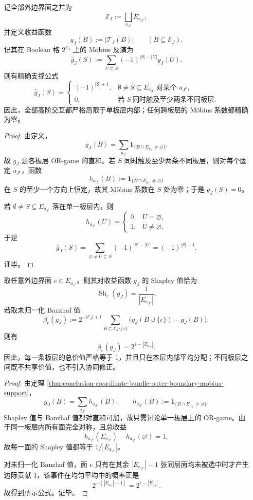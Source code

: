 \begin{theorem}\label{thm:conclusion-coordinate-bundle-outer-boundary-mobius-support}
记全部外边界面之并为
\[
\mathcal E_J:=\bigsqcup_{a_{J^c}}E_{a_{J^c}},
\]
并定义收益函数
\[
g_J(B):=|\mathcal T_J(B)|
\qquad
(B\subseteq \mathcal E_J).
\]
记其在 Boolean 格 \(2^{\mathcal E_J}\) 上的 Möbius 反演为
\[
\widehat g_J(S)
:=
\sum_{U\subseteq S}(-1)^{|S|-|U|}g_J(U).
\]
则有精确支撑公式
\[
\widehat g_J(S)=
\begin{cases}
(-1)^{|S|+1},& \emptyset\neq S\subseteq E_{a_{J^c}}\ \text{对某个 }a_{J^c},\\[0.6ex]
0,& \text{若 }S\ \text{同时触及至少两条不同板层}.
\end{cases}
\]
因此，全部高阶交互都严格局限于单板层内部；任何跨板层的 Möbius 系数都精确为零。
\end{theorem}
\begin{proof}
由定义，
\[
g_J(B)=\sum_{a_{J^c}}\mathbf 1_{\{B\cap E_{a_{J^c}}\neq \varnothing\}}.
\]
故 \(g_J\) 是各板层 OR-game 的直和。若 \(S\) 同时触及至少两条不同板层，则对每个固定 \(a_{J^c}\)，函数
\[
h_{a_{J^c}}(B):=\mathbf 1_{\{B\cap E_{a_{J^c}}\neq \varnothing\}}
\]
在 \(S\) 的至少一个方向上恒定，故其 Möbius 系数在 \(S\) 处为零；于是 \(\widehat g_J(S)=0\)。

若 \(\emptyset\neq S\subseteq E_{a_{J^c}}\) 落在单一板层内，则
\[
h_{a_{J^c}}(U)=
\begin{cases}
0,& U=\varnothing,\\
1,& U\neq \varnothing.
\end{cases}
\]
于是
\[
\widehat g_J(S)
=
\sum_{\varnothing\neq U\subseteq S}(-1)^{|S|-|U|}
=
(-1)^{|S|+1}.
\]
证毕。
\end{proof}

\begin{corollary}\label{cor:conclusion-coordinate-bundle-face-shapley-banzhaf}
取任意外边界面 \(e\in E_{a_{J^c}}\)。则其对收益函数 \(g_J\) 的 Shapley 值恰为
\[
\operatorname{Sh}_e(g_J)=\frac{1}{|E_{a_{J^c}}|}.
\]
若取未归一化 Banzhaf 值
\[
\beta_e(g_J):=
2^{-|\mathcal E_J|+1}
\sum_{B\subseteq \mathcal E_J\setminus\{e\}}
\bigl(g_J(B\cup\{e\})-g_J(B)\bigr),
\]
则有
\[
\beta_e(g_J)=2^{1-|E_{a_{J^c}}|}.
\]
因此，每一条板层的总价值严格等于 \(1\)，并且只在本层内部平均分配；不同板层之间既不共享价值，也不引入协同修正。
\end{corollary}
\begin{proof}
由定理 \ref{thm:conclusion-coordinate-bundle-outer-boundary-mobius-support}，
\[
g_J(B)=\sum_{a_{J^c}}h_{a_{J^c}}(B),
\qquad
h_{a_{J^c}}(B):=\mathbf 1_{\{B\cap E_{a_{J^c}}\neq\varnothing\}}.
\]
Shapley 值与 Banzhaf 值都对直和可加，故只需讨论单一板层上的 OR-game。由于同一板层内所有面完全对称，且总收益
\[
h_{a_{J^c}}(E_{a_{J^c}})-h_{a_{J^c}}(\varnothing)=1,
\]
故每一面的 Shapley 值都等于 \(1/|E_{a_{J^c}}|\)。

对未归一化 Banzhaf 值，面 \(e\) 只有在其余 \(|E_{a_{J^c}}|-1\) 张同层面均未被选中时才产生边际贡献 \(1\)，该事件在均匀平均中的概率正是
\[
2^{-(|E_{a_{J^c}}|-1)}=2^{1-|E_{a_{J^c}}|}.
\]
故得到所示公式。证毕。
\end{proof}

